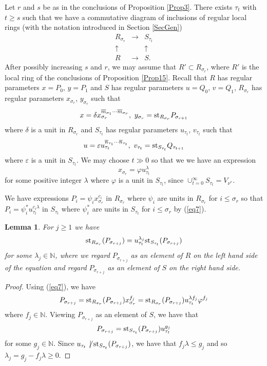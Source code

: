 \documentclass[11pt]{amsart}
\def\NZQ{\mathbb}               %
\def\NN{{\NZQ N}}
\newtheorem{Lemma}[Theorem]{Lemma}
\let\epsilon\varepsilon
\let\phi=\varphi
\begin{document}
Let $r$ and $s$ be as in the conclusions of Proposition \ref{Prop3}.
There exists $\tau_t$ with $t\ge s$ such that we have a commutative diagram of inclusions of regular local rings (with the notation introduced  in  Section \ref{SecGen})
$$
\begin{array}{ccc}
R_{\sigma_r}&\rightarrow &S_{\tau_t}\\
\uparrow&&\uparrow\\
R&\rightarrow&S.
\end{array}
$$
After possibly increasing $s$ and $r$, we may assume that $R'\subset R_{\sigma_r}$, where $R'$ is the local ring of the conclusions of Proposition \ref{Prop15}.
Recall that $R$ has regular parameters $x=P_0$, $y=P_1$ and $S$ has regular parameters $u=Q_0$, $v=Q_1$, $R_{\sigma_r}$ has regular parameters $x_{\sigma_r}$, $y_{\sigma_r}$ such that
$$
x=\delta x_{\sigma_r}^{\overline m_{\sigma_1}\cdots \overline m_{\sigma_r}},\,\, y_{\sigma_r}={\rm st}_{R_{\sigma_r}}P_{\sigma_{r+1}}
$$
where $\delta$ is a unit in $R_{\sigma_r}$ and 
$S_{\tau_t}$ has regular parameters $u_{\tau_t}$, $v_{\tau_t}$ such that
$$
u=\epsilon u_{\tau_t}^{\overline n_{\tau_1}\cdots \overline n_{\tau_t}},\,\,v_{\tau_t}={\rm st}_{S_{\tau_t}}Q_{\tau_{t+1}}
$$
where $\epsilon$ is a unit in $S_{\tau_t}$. We may choose $t\gg 0$ so that we we have an expression 
\begin{equation}\label{eq7}
x_{\sigma_r}=\phi u_{\tau_t}^{\lambda}
\end{equation}
for some positive integer $\lambda$ where $\phi$ is a unit in $S_{\tau_t}$, since $\cup_{t=0}^{\infty}S_{\tau_t}=V_{\nu^*}$.

We have expressions $P_i=\psi_i x_{\sigma_r}^{c_i}$ in $R_{\sigma_r}$ where $\psi_i$ are units in $R_{\sigma_r}$ for $i\le \sigma_r$ so that 
$P_i=\psi_i^* u_{\tau_t}^{c_i\lambda}$ in $S_{\tau_t}$ where $\psi_i^*$ are units in $S_{\tau_t}$ for $i\le \sigma_r$ by (\ref{eq7}).

\begin{Lemma}\label{Lemma3} For $j\ge 1$ we have
$$
{\rm st}_{R_{\sigma_r}}(P_{\sigma_{r+j}})=u_{\tau_t}^{\lambda_j}{\rm st}_{S_{\tau_t}}(P_{\sigma_{r+j}})
$$
for some $\lambda_j\in \NN$,  where we regard $P_{\sigma_{r+j}}$ as an element of $R$ on the left hand side of the equation and regard $P_{\sigma_{r+j}}$ as an element of $S$ on the right hand side.  
\end{Lemma}

\begin{proof} Using (\ref{eq7}), we have 
$$
P_{\sigma_{r+j}}={\rm st}_{R_{\sigma_r}}(P_{\sigma_{r+j}})x_{\sigma_r}^{f_j}
={\rm st}_{R_{\sigma_r}}(P_{\sigma_{r+j}})u_{\tau_t}^{\lambda f_j}\phi^{f_j}
$$
where $f_j\in \NN$. 
Viewing $P_{\sigma_{r+j}}$ as an element of $S$, we have that
$$
P_{\sigma_{r+j}}={\rm st}_{S_{\tau_t}}(P_{\sigma_{r+j}})u_{\tau_t}^{g_j}
$$
for some $g_j\in \NN$. Since $u_{\tau_t}\not\,\mid {\rm st}_{S_{\tau_t}}(P_{\sigma_{r+j}})$, we have that $f_j\lambda \le g_j$ and so $\lambda_j=g_j-f_j\lambda\ge 0$.

\end{proof}
\end{document}
